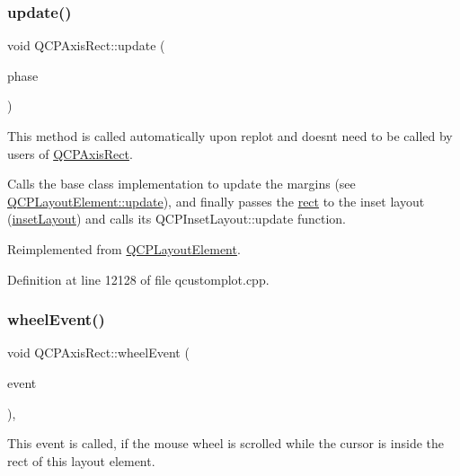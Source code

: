 \subsubsection{\texorpdfstring{update()}{update()}}
{\footnotesize\ttfamily void Q\+C\+P\+Axis\+Rect\+::update (\begin{DoxyParamCaption}\item[{\hyperlink{class_q_c_p_layout_element_a0d83360e05735735aaf6d7983c56374d}{Update\+Phase}}]{phase }\end{DoxyParamCaption})\hspace{0.3cm}{\ttfamily [virtual]}}

This method is called automatically upon replot and doesn\textquotesingle{}t need to be called by users of \hyperlink{class_q_c_p_axis_rect}{Q\+C\+P\+Axis\+Rect}.

Calls the base class implementation to update the margins (see \hyperlink{class_q_c_p_layout_element_a929c2ec62e0e0e1d8418eaa802e2af9b}{Q\+C\+P\+Layout\+Element\+::update}), and finally passes the \hyperlink{class_q_c_p_layout_element_a208effccfe2cca4a0eaf9393e60f2dd4}{rect} to the inset layout (\hyperlink{class_q_c_p_axis_rect_a949f803466619924c7018df4b511ae10}{inset\+Layout}) and calls its Q\+C\+P\+Inset\+Layout\+::update function. 

Reimplemented from \hyperlink{class_q_c_p_layout_element_a929c2ec62e0e0e1d8418eaa802e2af9b}{Q\+C\+P\+Layout\+Element}.



Definition at line 12128 of file qcustomplot.\+cpp.

\mbox{\label{class_q_c_p_axis_rect_a5acf41fc30aa68ea263246ecfad85c31}} 
\subsubsection{\texorpdfstring{wheel\+Event()}{wheelEvent()}}
{\footnotesize\ttfamily void Q\+C\+P\+Axis\+Rect\+::wheel\+Event (\begin{DoxyParamCaption}\item[{Q\+Wheel\+Event $\ast$}]{event }\end{DoxyParamCaption})\hspace{0.3cm}{\ttfamily [protected]}, {\ttfamily [virtual]}}

This event is called, if the mouse wheel is scrolled while the cursor is inside the rect of this layout element. 

